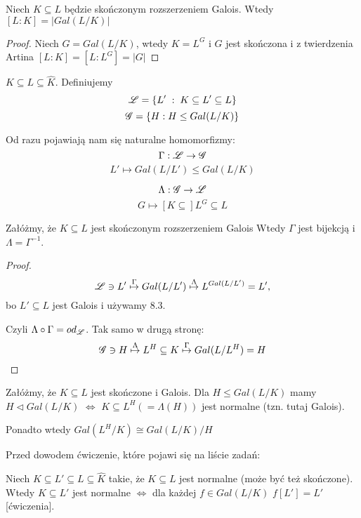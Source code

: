 \begin{conclusion}
Niech $K\subseteq L$ będzie skończonym rozszerzeniem Galois. Wtedy $[L:K]=|Gal(L/K)|$
\end{conclusion}

\begin{proof}
Niech $G=Gal(L/K)$, wtedy $K=L^G$ i $G$ jest skończona i z twierdzenia Artina $[L:K]=[L:L^G]=|G|$
\end{proof}

\begin{bbox}
$K\subseteq L\subseteq\hat{K}$. Definiujemy
$$\mathcal{L}=\{L'\;:\;K\subseteq L'\subseteq L\}$$
$$\mathcal{G}=\{H:H\leq Gal(L/K)\}$$
\end{bbox}

Od razu pojawiają nam się naturalne homomorfizmy:
$$\Gamma:\mathcal{L}\to\mathcal{G}$$
$$L'\mapsto Gal(L/L')\leq Gal(L/K)$$

$$\Lambda:\mathcal{G}\to\mathcal{L}$$
$$G\mapsto [K\subseteq]L^{G}\subseteq L$$

\begin{theorem}
Załóżmy, że $K\subseteq L$ jest skończonym rozszerzeniem Galois Wtedy $\Gamma$ jest bijekcją i $\Lambda=\Gamma^{-1}$. 
\end{theorem}

\begin{proof}
$$\mathcal{L}\ni L'\overset{\Gamma}{\mapsto}Gal(L/L')\overset{\Lambda}{\mapsto}L^{Gal(L/L')}=L',$$
bo $L'\subseteq L$ jest Galois i używamy 8.3.

Czyli $\Lambda\circ\Gamma=od_{\mathcal{L}}$. Tak samo w drugą stronę:
$$\mathcal{G}\ni H\overset{\Lambda}{\mapsto}L^H\subseteq K\overset{\Gamma}{\mapsto}Gal(L/L^H)=H$$
\end{proof}

\setcounter{theorem}{8}

\begin{conclusion}
Załóżmy, że $K\subseteq L$ jest skończone i Galois. Dla $H\leq Gal(L/K)$ mamy $H\triangleleft Gal(L/K)$ $\iff$ $K\subseteq L^H(=\Lambda(H))$ jest normalne (tzn. tutaj Galois).

Ponadto wtedy $Gal(L^H/K)\cong Gal(L/K)/H$
\end{conclusion}

Przed dowodem ćwiczenie, które pojawi się na liście zadań:

Niech $K\subseteq L'\subseteq L\subseteq\hat{K}$ takie, że $K\subseteq L$ jest normalne (może być też skończone). Wtedy $K\subseteq L'$ jest normalne $\iff$ dla każdej $f\in Gal(L/K)$ $f[L']=L'$ [ćwiczenia].

